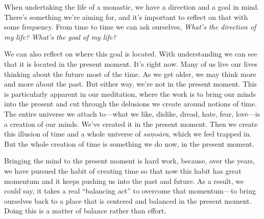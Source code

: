 
When undertaking the life of a monastic, we have a direction and a goal 
in mind. There's something we're aiming for, and it's important to 
reflect on that with some frequency. From time to time we can ask 
ourselves, \emph{What's the direction of my life? What's the goal of my 
life?}

We can also reflect on where this goal is located. With understanding 
we can see that it is located in the present moment. It's right now. 
Many of us live our lives thinking about the future most of the time. 
As we get older, we may think more and more about the past. But either 
way, we're not in the present moment. This is particularly apparent in 
our meditation, where the work is to bring our minds into the present 
and cut through the delusions we create around notions of time. The 
entire universe we attach to---what we like, dislike, dread, hate, 
fear, love---is a creation of our minds. We've created it in the 
present moment. Then we create this illusion of time and a whole 
universe of \emph{saṃsāra}, which we feel trapped in. But the whole 
creation of time is something we do now, in the present moment.

Bringing the mind to the present moment is hard work, because, over the 
years, we have pursued the habit of creating time so that now this 
habit has great momentum and it keeps pushing us into the past and 
future. As a result, we could say, it takes a real ``balancing act'' to 
overcome that momentum---to bring ourselves back to a place that is 
centered and balanced in the present moment. Doing this is a matter of 
balance rather than effort.

